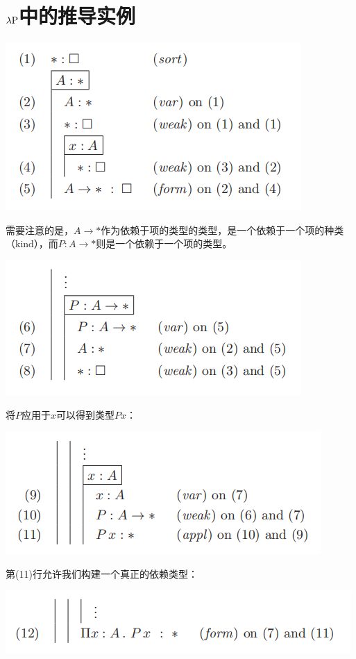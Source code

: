 \documentclass[UTF8]{article}
\begin{document}
	\section{$\lambda{\rm P}$中的推导实例}
		\includegraphics[width=0.93\linewidth]{"../imgs/5-2.png"}
		
		需要注意的是，$A\rightarrow*$作为依赖于项的类型的类型，是一个依赖于一个项的种类（kind），而$P:A\rightarrow*$则是一个依赖于一个项的类型。
		
		\includegraphics[width=0.93\linewidth]{"../imgs/5-3.png"}
		
		将$P$应用于$x$可以得到类型$Px$：
		
		\includegraphics[width=0.93\linewidth]{"../imgs/5-4.png"}
		
		第(11)行允许我们构建一个真正的依赖类型：
		
		\includegraphics[width=0.93\linewidth]{"../imgs/5-5.png"}
		
\end{document}
